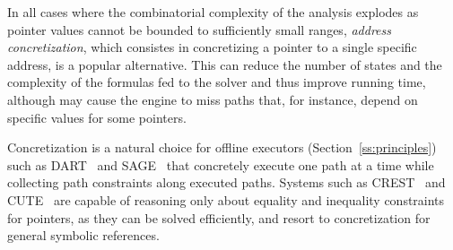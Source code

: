 In all cases where the combinatorial complexity of the analysis explodes as pointer values cannot be bounded to sufficiently small ranges, {\em address concretization}, which consistes in concretizing a pointer to a single specific address, is a popular alternative. This can reduce the number of states and the complexity of the formulas fed to the solver and thus improve running time, although may cause the engine to miss paths that, for instance, depend on specific values for some pointers. 

Concretization is a natural choice for offline executors (Section~\ref{ss:principles}) such as {\sc DART}~\cite{DART-PLDI05} and {\sc SAGE}~\cite{SAGE-NDSS08} that concretely execute one path at a time while collecting path constraints along executed paths. Systems such as {\sc CREST}~\cite{CREST-ASE08} and {\sc CUTE}~\cite{CUTE-FSE13} are capable of reasoning only about equality and inequality constraints for pointers, as they can be solved efficiently, and resort to concretization for general symbolic references.






